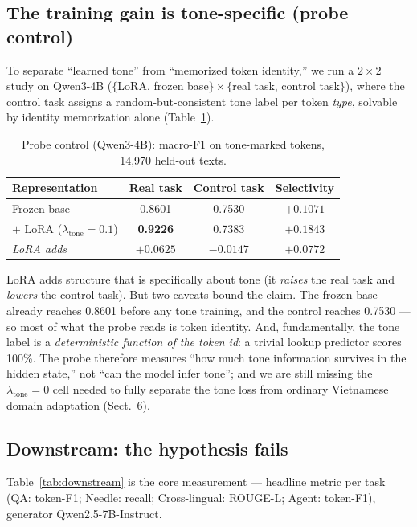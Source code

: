 \documentclass[runningheads]{llncs}
\begin{document}
\subsection{The training gain is tone-specific (probe control)}

To separate ``learned tone'' from ``memorized token identity,'' we run a $2{\times}2$ study on Qwen3-4B ($\{$LoRA, frozen base$\}\times\{$real task, control task$\}$), where the control task assigns a random-but-consistent tone label per token \emph{type}, solvable by identity memorization alone (Table~\ref{tab:probe}).

\begin{table}[H]
\centering
\caption{Probe control (Qwen3-4B): macro-F1 on tone-marked tokens, 14{,}970 held-out texts.}
\label{tab:probe}
\begin{tabular}{lccc}
\toprule
\textbf{Representation} & \textbf{Real task} & \textbf{Control task} & \textbf{Selectivity} \\
\midrule
Frozen base & 0.8601 & 0.7530 & $+0.1071$ \\
$+$ LoRA ($\lambda_{\text{tone}}{=}0.1$) & \textbf{0.9226} & 0.7383 & \textbf{$+0.1843$} \\
\textit{LoRA adds} & \textbf{$+0.0625$} & \textbf{$-0.0147$} & $+0.0772$ \\
\bottomrule
\end{tabular}
\end{table}

LoRA adds structure that is specifically about tone (it \emph{raises} the real task and \emph{lowers} the control task). But two caveats bound the claim. The frozen base already reaches 0.8601 before any tone training, and the control reaches 0.7530 --- so most of what the probe reads is token identity. And, fundamentally, the tone label is a \emph{deterministic function of the token id}: a trivial lookup predictor scores 100\%. The probe therefore measures ``how much tone information survives in the hidden state,'' not ``can the model infer tone''; and we are still missing the $\lambda_{\text{tone}}{=}0$ cell needed to fully separate the tone loss from ordinary Vietnamese domain adaptation (Sect.~6).

\subsection{Downstream: the hypothesis fails}

Table~\ref{tab:downstream} is the core measurement --- headline metric per task (QA: token-F1; Needle: recall; Cross-lingual: ROUGE-L; Agent: token-F1), generator Qwen2.5-7B-Instruct.
\end{document}
